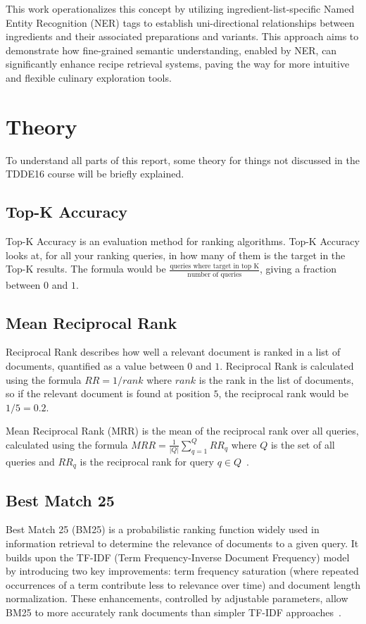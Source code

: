 \documentclass[11pt]{article}
\begin{document}
This work operationalizes this concept by utilizing ingredient-list-specific
Named Entity Recognition (NER) tags to establish uni-directional relationships
between ingredients and their associated preparations and variants.
This approach aims to demonstrate how fine-grained semantic understanding,
enabled by NER, can significantly enhance recipe retrieval systems, paving the
way for more intuitive and flexible culinary exploration tools.

\section{Theory}
To understand all parts of this report, some theory for things not discussed in
the TDDE16 course will be briefly explained.
\subsection{Top-K Accuracy}
Top-K Accuracy is an evaluation method for ranking algorithms.
Top-K Accuracy looks at, for all your ranking queries, in how many of them is the
target in the Top-K results.
The formula would be $\frac{\text{queries where target in top K}}{\text{number of
queries}}$, giving a fraction between $0$ and $1$\cite{topkacc}.
\subsection{Mean Reciprocal Rank}
Reciprocal Rank describes how well a relevant document is ranked in a list of
documents, quantified as a value between $0$ and $1$.
Reciprocal Rank is calculated using the formula $RR = 1/rank$ where $rank$ is the
rank in the list of documents, so if the relevant document is found at position
$5$, the reciprocal rank would be $1/5 = 0.2$.

Mean Reciprocal Rank (MRR) is the mean of the reciprocal rank over all queries,
calculated using the formula $MRR = \frac{1}{|Q|} \sum_{q=1}^Q{RR_q}$ where $Q$ is
the set of all queries and $RR_q$ is the reciprocal rank for query $q \in
Q$~\cite{mrr}.
\subsection{Best Match 25}
Best Match 25 (BM25) is a probabilistic ranking function widely used in
information retrieval to determine the relevance of documents to a given query.
It builds upon the TF-IDF (Term Frequency-Inverse Document Frequency) model by
introducing two key improvements: term frequency saturation (where repeated
occurrences of a term contribute less to relevance over time) and document
length normalization. These enhancements, controlled by adjustable parameters,
allow BM25 to more accurately rank documents than simpler TF-IDF
approaches~\cite{ogBM25, improvmenetsBM25}.
\end{document}
